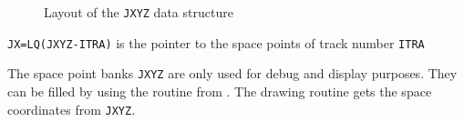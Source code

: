     
    

\begin{figure}[hbt]
     \centering
     \caption{Layout of the {\tt JXYZ} data structure}
     \label{fg:trak499-1}
\end{figure}

{\tt JX=LQ(JXYZ-ITRA)} is the pointer to the space points of track number 
{\tt ITRA}
 
The space point banks {\tt JXYZ} are only used for debug and display
purposes. They can be filled by using the routine  from
. The drawing routine 
gets the space coordinates from {\tt JXYZ}.
